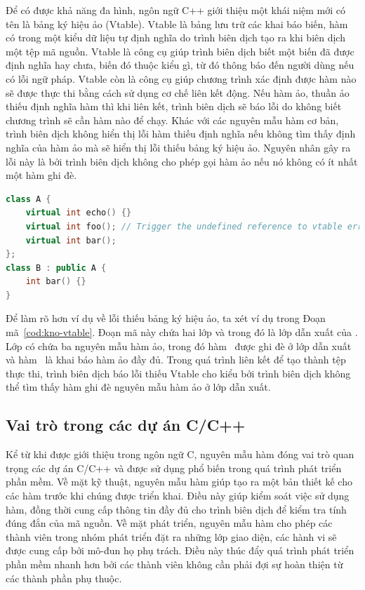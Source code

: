Để có được khả năng đa hình, ngôn ngữ C++ giới thiệu một khái niệm mới có tên là bảng ký hiệu ảo (Vtable). Vtable là bảng lưu trữ các khai báo biến, hàm có trong một kiểu dữ liệu tự định nghĩa do trình biên dịch tạo ra khi biên dịch một tệp mã nguồn. Vtable là công cụ giúp trình biên dịch biết một biến đã được định nghĩa hay chưa, biến đó thuộc kiểu gì, từ đó thông báo đến người dùng nếu có lỗi ngữ pháp. Vtable còn là công cụ giúp chương trình xác định được hàm nào sẽ được thực thi bằng cách sử dụng cơ chế liên kết động. Nếu hàm ảo, thuần ảo thiếu định nghĩa hàm thì khi liên kết, trình biên dịch sẽ báo lỗi do không biết chương trình sẽ cần hàm nào để chạy. Khác với các nguyên mẫu hàm cơ bản, trình biên dịch không hiển thị lỗi hàm thiếu định nghĩa nếu không tìm thấy định nghĩa của hàm ảo mà sẽ hiển thị lỗi thiếu bảng ký hiệu ảo. Nguyên nhân gây ra lỗi này là bởi trình biên dịch không cho phép gọi hàm ảo nếu nó không có ít nhất một hàm ghi đè.\\

\begin{lstlisting}[language=C++, captionpos=b, caption={Ví dụ về lỗi thiếu bảng ký hiệu ảo.}, label={cod:kno-vtable}]
class A {
	virtual int echo() {}
	virtual int foo(); // Trigger the undefined reference to vtable error
	virtual int bar();
};
class B : public A {
	int bar() {}
}
\end{lstlisting}

Để làm rõ hơn ví dụ về lỗi thiếu bảng ký hiệu ảo, ta xét ví dụ trong Đoạn mã~\ref{cod:kno-vtable}. Đoạn mã này chứa hai lớp  và  trong đó  là lớp dẫn xuất của . Lớp  có chứa ba nguyên mẫu hàm ảo, trong đó hàm~ được ghi đè ở lớp dẫn xuất và hàm~ là khai báo hàm ảo đầy đủ. Trong quá trình liên kết để tạo thành tệp thực thi, trình biên dịch báo lỗi thiếu Vtable cho kiểu  bởi trình biên dịch không thể tìm thấy hàm ghi đè nguyên mẫu hàm ảo  ở lớp dẫn xuất.

\subsection{Vai trò trong các dự án C/C++}
Kể từ khi được giới thiệu trong ngôn ngữ C, nguyên mẫu hàm đóng vai trò quan trọng các dự án C/C++ và được sử dụng phổ biến trong quá trình phát triển phần mềm.	Về mặt kỹ thuật, nguyên mẫu hàm giúp tạo ra một bản thiết kế cho các hàm trước khi chúng được triển khai. Điều này giúp kiểm soát việc sử dụng hàm, đồng thời cung cấp thông tin đầy đủ cho trình biên dịch để kiểm tra tính đúng đắn của mã nguồn. Về mặt phát triển, nguyên mẫu hàm cho phép các thành viên trong nhóm phát triển đặt ra những lớp giao diện, các hành vi sẽ được cung cấp bởi mô-đun họ phụ trách. Điều này thúc đẩy quá trình phát triển phần mềm nhanh hơn bởi các thành viên không cần phải đợi sự hoàn thiện từ các thành phần phụ thuộc. 

